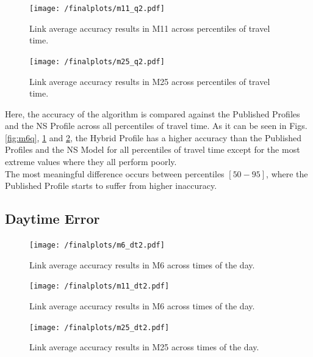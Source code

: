 \documentclass[letterpaper, 10 pt, conference]{ieeeconf}  %
\begin{document}
\begin{figure}[htbp]
	\centering
	\texttt{[image: /finalplots/m11\_q2.pdf]}
	\caption{Link average accuracy results in M11 across percentiles of travel time.}
	\label{fig:m11q}
\end{figure}

\begin{figure}[htbp]
	\centering
	\texttt{[image: /finalplots/m25\_q2.pdf]}
	\caption{Link average accuracy results in M25 across percentiles of travel time.}
	\label{fig:m25q}
\end{figure}
Here, the accuracy of the algorithm is compared against the Published Profiles and the NS Profile across all percentiles of travel time.
As it can be seen in Figs. \ref{fig:m6q}, \ref{fig:m11q} and \ref{fig:m25q}, the Hybrid Profile has a higher accuracy than the Published Profiles and the NS Model for all percentiles of travel time except for the most extreme values where they all perform poorly.\\
The most meaningful difference occurs between percentiles $[50-95]$, where the Published Profile starts to suffer from higher inaccuracy.

\subsection{Daytime Error}
\begin{figure}[htbp]
	\centering
		\texttt{[image: /finalplots/m6\_dt2.pdf]}
	\caption{Link average accuracy results in M6 across times of the day.}
	\label{fig:m6daytime}
\end{figure}

\begin{figure}[htbp]
	\centering
	\texttt{[image: /finalplots/m11\_dt2.pdf]}
	\caption{Link average accuracy results in M6 across times of the day.}
	\label{fig:m11daytime}
\end{figure}

\begin{figure}[htbp]
	\centering
	\texttt{[image: /finalplots/m25\_dt2.pdf]}
	\caption{Link average accuracy results in M25 across times of the day.}
	\label{fig:m25daytime}
\end{figure}
\end{document}
